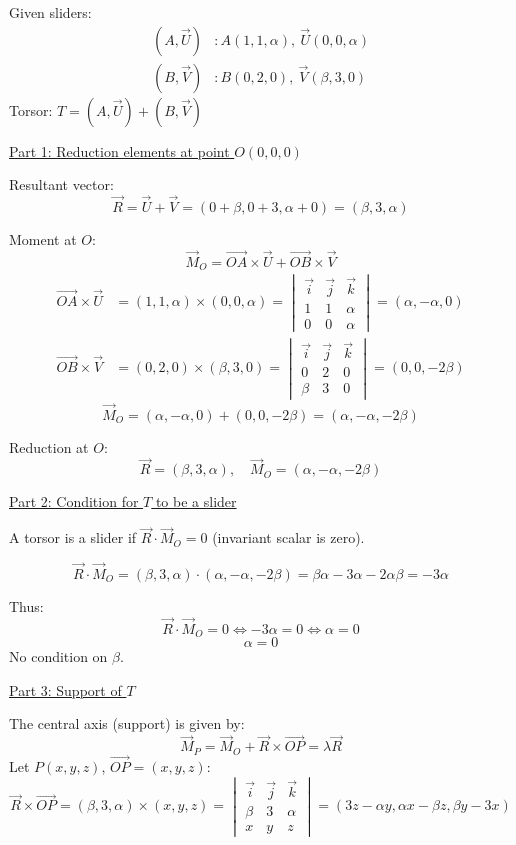 \documentclass[12pt]{article}
\begin{document}
\begin{correctionbox}
Given sliders:
\begin{align*}
(A, \vec{U}) & : A(1,1,\alpha), \ \vec{U}(0,0,\alpha) \\
(B, \vec{V}) & : B(0,2,0), \ \vec{V}(\beta,3,0)
\end{align*}
Torsor: $T = (A, \vec{U}) + (B, \vec{V})$

\underline{Part 1: Reduction elements at point $O(0,0,0)$}

Resultant vector:
\[
\vec{R} = \vec{U} + \vec{V} = (0+\beta, 0+3, \alpha+0) = (\beta, 3, \alpha)
\]

Moment at $O$:
\[
\vec{M}_O = \vec{OA} \times \vec{U} + \vec{OB} \times \vec{V}
\]
\begin{align*}
\vec{OA} \times \vec{U} &= (1,1,\alpha) \times (0,0,\alpha) = 
\begin{vmatrix}
\vec{i} & \vec{j} & \vec{k} \\
1 & 1 & \alpha \\
0 & 0 & \alpha
\end{vmatrix}
= (\alpha, -\alpha, 0) \\
\vec{OB} \times \vec{V} &= (0,2,0) \times (\beta,3,0) = 
\begin{vmatrix}
\vec{i} & \vec{j} & \vec{k} \\
0 & 2 & 0 \\
\beta & 3 & 0
\end{vmatrix}
= (0, 0, -2\beta)
\end{align*}
\[
\vec{M}_O = (\alpha, -\alpha, 0) + (0, 0, -2\beta) = (\alpha, -\alpha, -2\beta)
\]

Reduction at $O$:
\[
\boxed{\vec{R} = (\beta, 3, \alpha), \quad \vec{M}_O = (\alpha, -\alpha, -2\beta)}
\]

\underline{Part 2: Condition for $T$ to be a slider}

A torsor is a slider if $\vec{R} \cdot \vec{M}_O = 0$ (invariant scalar is zero).

\[
\vec{R} \cdot \vec{M}_O = (\beta, 3, \alpha) \cdot (\alpha, -\alpha, -2\beta) = \beta\alpha - 3\alpha - 2\alpha\beta = -3\alpha
\]

Thus:
\[
\vec{R} \cdot \vec{M}_O = 0 \iff -3\alpha = 0 \iff \alpha = 0
\]
\[
\boxed{\alpha = 0}
\]
No condition on $\beta$.

\underline{Part 3: Support of $T$}

The central axis (support) is given by:
\[
\vec{M}_P = \vec{M}_O + \vec{R} \times \vec{OP} = \lambda \vec{R}
\]
Let $P(x,y,z)$, $\vec{OP} = (x,y,z)$:
\[
\vec{R} \times \vec{OP} = (\beta, 3, \alpha) \times (x,y,z) = 
\begin{vmatrix}
\vec{i} & \vec{j} & \vec{k} \\
\beta & 3 & \alpha \\
x & y & z
\end{vmatrix}
= (3z - \alpha y, \alpha x - \beta z, \beta y - 3x)
\]


\end{correctionbox}
\end{document}
